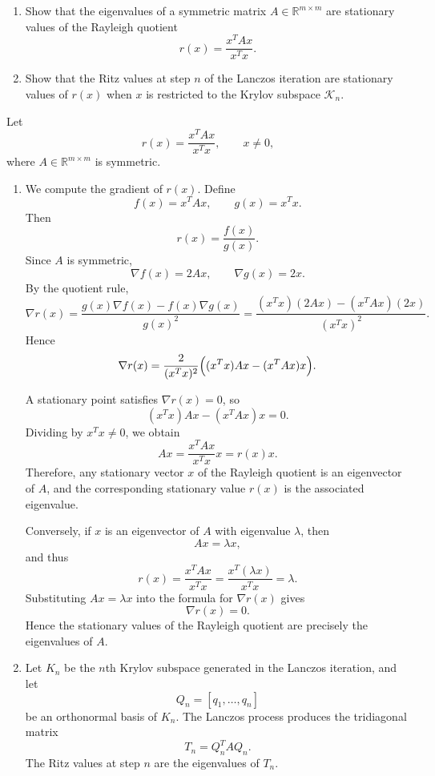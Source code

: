 \documentclass{ctexart}
\begin{document}
  \begin{problem}\label{pro:9}
    \begin{enumerate}[label=(\alph*)]
      \item Show that the eigenvalues of a symmetric matrix
        $A \in \mathbb{R}^{m \times m}$ are stationary values of the Rayleigh quotient
        \[
          r(x) = \frac{x^T A x}{x^T x}.
        \]

      \item Show that the Ritz values at step $n$ of the Lanczos iteration
        are stationary values of $r(x)$ when $x$ is restricted to the Krylov subspace
        $\mathcal{K}_n$.
    \end{enumerate}
  \end{problem}
  \begin{solution}

    Let
    \[
      r(x)=\frac{x^T A x}{x^T x}, \qquad x\neq 0,
    \]
    where $A\in\mathbb{R}^{m\times m}$ is symmetric.
    \begin{enumerate}
      \item We compute the gradient of $r(x)$. Define
        \[
          f(x)=x^T A x,\qquad g(x)=x^T x.
        \]
        Then
        \[
          r(x)=\frac{f(x)}{g(x)}.
        \]
        Since $A$ is symmetric,
        \[
          \nabla f(x)=2Ax,
          \qquad
          \nabla g(x)=2x.
        \]
        By the quotient rule,
        \[
          \nabla r(x)
          =
          \frac{g(x)\nabla f(x)-f(x)\nabla g(x)}{g(x)^2}
          =
          \frac{(x^T x)(2Ax)-(x^T A x)(2x)}{(x^T x)^2}.
        \]
        Hence
        \[
          \nabla r(x)
          =
          \frac{2}{(x^T x)^2}
          \Bigl((x^T x)Ax-(x^T A x)x\Bigr).
        \]

        A stationary point satisfies $\nabla r(x)=0$, so
        \[
          (x^T x)Ax-(x^T A x)x=0.
        \]
        Dividing by $x^T x\neq 0$, we obtain
        \[
          Ax=\frac{x^T A x}{x^T x}x=r(x)x.
        \]
        Therefore, any stationary vector $x$ of the Rayleigh quotient is an eigenvector of $A$,
        and the corresponding stationary value $r(x)$ is the associated eigenvalue.

        Conversely, if $x$ is an eigenvector of $A$ with eigenvalue $\lambda$, then
        \[
          Ax=\lambda x,
        \]
        and thus
        \[
          r(x)=\frac{x^T A x}{x^T x}
          =\frac{x^T(\lambda x)}{x^T x}
          =\lambda.
        \]
        Substituting $Ax=\lambda x$ into the formula for $\nabla r(x)$ gives
        \[
          \nabla r(x)=0.
        \]
        Hence the stationary values of the Rayleigh quotient are precisely the eigenvalues of $A$.
      \item Let $K_n$ be the $n$th Krylov subspace generated in the Lanczos iteration, and let
        \[
          Q_n=[q_1,\dots,q_n]
        \]
        be an orthonormal basis of $K_n$. The Lanczos process produces the tridiagonal matrix
        \[
          T_n = Q_n^T A Q_n.
        \]
        The Ritz values at step $n$ are the eigenvalues of $T_n$.


\end{enumerate}
\end{solution}
\end{document}
